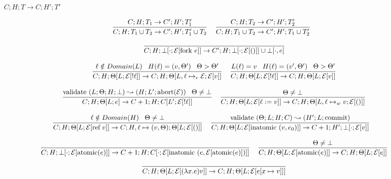 \documentclass[9pt]{article}
\newcommand{\eval}[1]{\mathcal{E}[#1]}
\newcommand{\ctxt}[0]{\mathcal{E}}
\newcommand{\loc}[0]{\ell}
\newcommand{\atomic}[1]{\text{atomic}(#1)}
\newcommand{\alloc}[1]{\text{ref} \; #1}
\newcommand{\commit}[0]{\text{commit}}
\newcommand{\abort}[1]{\text{abort}(#1)}
\newcommand{\fork}[1]{\text{fork } #1}
\newcommand{\inatomic}[1]{\text{inatomic }(#1)}
\newcommand{\validate}[1]{\text{validate }(#1)}
\begin{document}
$\boxed{C; H; T \rightarrow C; H' ;T'}$

\[%
\infer[]{C; H; T_1 \cup T_2 \rightarrow C'; H'; T_1' \cup T_2}{C; H; T_1 \rightarrow C'; H'; T_1'} \;\;\;
\infer[]{C; H; T_1 \cup T_2 \rightarrow C'; H'; T_1 \cup T_2'}{C; H; T_2 \rightarrow C'; H'; T_2'} \;\;\; 
\]

\[%
\infer[]{C; H; \bot[\cdot; \eval{\fork{e}}] \rightarrow C'; H; \bot[\cdot; \eval{()}] \cup \bot[\cdot, e]}{}
\]

\[%
\infer[]{C; H; \Theta[L; \eval{!\loc}] \rightarrow C; H; \Theta[L, \loc \mapsto_r \ctxt; \eval{v}]}{\loc \notin Domain(L) \;\;\; H(\loc) = (v, \Theta') \;\;\; \Theta > \Theta'}  \;\;\;
\infer[]{C; H; \Theta[L; \eval{!\loc}] \rightarrow C; H; \Theta[L; \eval{v}]}{L(\loc) = v \;\;\; H(\loc) = (v', \Theta') \;\;\; \Theta > \Theta'} 
\]

\[%
\infer[]{C; H; \Theta[L; e] \rightarrow C+1; H; C[L'; \ctxt[!\loc]]}{\validate{L; \Theta; H; \bot} \leadsto (H; L'; \abort{\ctxt}) \;\;\; \Theta \neq \bot} \;\;\;
\infer[]{C; H; \Theta[L; \eval{\loc := v}] \rightarrow C; H; \Theta[L, \loc \mapsto_w v; \eval{()}]}{\Theta \neq \bot} 
\]

\[%
\infer[]{C; H; \Theta[L; \eval{\alloc{v}}] \rightarrow C; H, \loc \mapsto (v, \Theta); \Theta[L;  \eval{()}]}{\loc \notin Domain(H) \;\;\; \Theta \neq \bot} \;\;\;
\infer[]{C; H; \Theta[L; \eval{\inatomic{v, e_0}}] \rightarrow C+1; H'; \bot[\cdot; \eval{v}]}{\validate{\Theta; L; H; C} \leadsto (H'; L; \commit)} \;\;\;
\]

\[
\infer[]{C; H; \bot[\cdot; \eval{\atomic{e}}] \rightarrow C+1; H; C[\cdot; \eval{\inatomic{e, \eval{\atomic{e}}}}]}{} \;\;\;
\infer[]{C; H; \Theta[L; \eval{\atomic{e}}] \rightarrow C; H; \Theta[L; \eval{e}]}{\Theta \neq \bot}
\]

\[
\infer[]{C; H; \Theta[L; \eval{(\lambda x. e) v}] \rightarrow C; H; \Theta[L; \eval{e[x\mapsto v]}]}{}
\]
\end{document}

